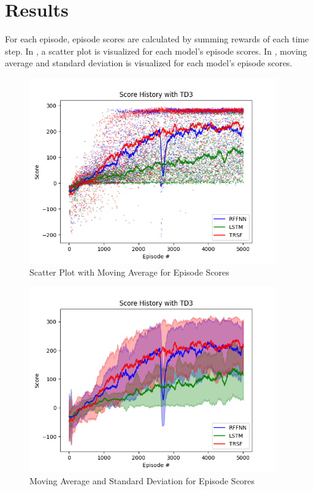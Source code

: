 \section{Results}
For each episode, episode scores are calculated by summing rewards of each time step. In , a scatter plot is visualized for each model's episode scores. In , moving average and standard deviation is visualized for each model's episode scores. \\
\begin{figure}
	\centering
	\includegraphics[width=0.95\textwidth]{figures/bipedal/SCATTER_TD3_RFFNN_LSTM_TRSF.png}
	\caption{Scatter Plot with Moving Average for Episode Scores}
	\label{fig:scatter_ep_rewards}
\end{figure}
\begin{figure}
	\centering
	\includegraphics[width=0.95\textwidth]{figures/bipedal/STD_TD3_RFFNN_LSTM_TRSF.png}
	\caption{Moving Average and Standard Deviation for Episode Scores}
	\label{fig:std_ep_rewards}
\end{figure}
